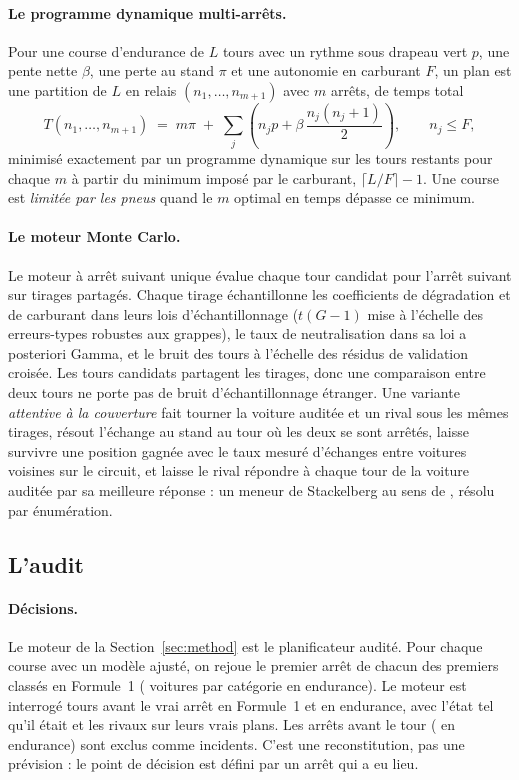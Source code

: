 \documentclass[11pt,a4paper]{article}
\begin{document}
\paragraph{Le programme dynamique multi-arrêts.} Pour une course d'endurance de
$L$ tours avec un rythme sous drapeau vert $p$, une pente nette $\beta$, une
perte au stand $\pi$ et une autonomie en carburant $F$, un plan est une
partition de $L$ en relais $(n_1,\dots,n_{m+1})$ avec $m$ arrêts, de temps total
%
\begin{equation}
T(n_1,\dots,n_{m+1}) \;=\; m\pi \;+\; \sum_{j}\left(n_j p + \beta\,\frac{n_j(n_j+1)}{2}\right),
\qquad n_j \le F,
\label{eq:dp}
\end{equation}
%
minimisé exactement par un programme dynamique sur les tours restants pour
chaque $m$ à partir du minimum imposé par le carburant,
$\lceil L/F \rceil - 1$. Une course est \emph{limitée par les pneus} quand le $m$
optimal en temps dépasse ce minimum.

\paragraph{Le moteur Monte Carlo.} Le moteur à arrêt suivant unique évalue
chaque tour candidat pour l'arrêt suivant sur \NDraws{} tirages partagés. Chaque
tirage échantillonne les coefficients de dégradation et de carburant dans leurs
lois d'échantillonnage ($t(G-1)$ mise à l'échelle des erreurs-types robustes aux
grappes), le taux de neutralisation dans sa loi a posteriori Gamma, et le bruit
des tours à l'échelle des résidus de validation croisée. Les tours candidats
partagent les tirages, donc une comparaison entre deux tours ne porte pas de
bruit d'échantillonnage étranger. Une variante \emph{attentive à la couverture}
fait tourner la voiture auditée et un rival sous les mêmes tirages, résout
l'échange au stand au tour où les deux se sont arrêtés, laisse survivre une
position gagnée avec le taux mesuré d'échanges entre voitures voisines sur le
circuit, et laisse le rival répondre à chaque tour de la voiture auditée par sa
meilleure réponse : un meneur de Stackelberg au sens de \citet{aguad2024},
résolu par énumération.

\subsection{L'audit}
\label{sec:auditprotocol}

\paragraph{Décisions.} Le moteur de la Section~\ref{sec:method} est le
planificateur audité. Pour chaque course avec un modèle ajusté, on rejoue le
premier arrêt de chacun des \NFinishers{} premiers classés en Formule~1
(\NCars{} voitures par catégorie en endurance). Le moteur est interrogé
\LookbackFone{} tours avant le vrai arrêt en Formule~1 et \LookbackEnd{} en
endurance, avec l'état tel qu'il était et les rivaux sur leurs vrais plans. Les
arrêts avant le tour \MinFirstStopFone{} (\MinFirstStopEnd{} en endurance) sont
exclus comme incidents. C'est une reconstitution, pas une prévision : le point
de décision est défini par un arrêt qui a eu lieu.
\end{document}
